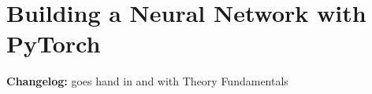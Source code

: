 \chapter{Building a Neural Network with PyTorch}

\setcounter{section}{0}

\textbf{Changelog:} goes hand in and with Theory Fundamentals\\

\pagebreak
